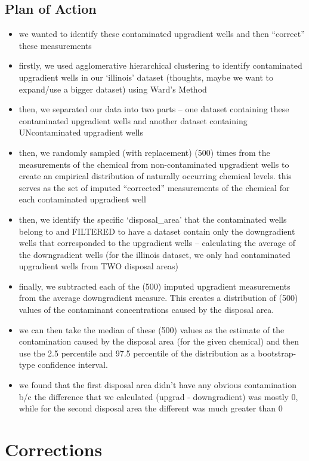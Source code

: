 \documentclass[12pt, twoside]{amherstthesis}
\begin{document}
\hypertarget{plan-of-action}{%
\section{Plan of Action}\label{plan-of-action}}
\begin{itemize}
\item
  we wanted to identify these contaminated upgradient wells and then ``correct'' these measurements
\item
  firstly, we used agglomerative hierarchical clustering to identify contaminated upgradient wells in our `illinois' dataset (thoughts, maybe we want to expand/use a bigger dataset) using Ward's Method
\item
  then, we separated our data into two parts -- one dataset containing these contaminated upgradient wells and another dataset containing UNcontaminated upgradient wells
\item
  then, we randomly sampled (with replacement) (500) times from the measurements of the chemical from non-contaminated upgradient wells to create an empirical distribution of naturally occurring chemical levels. this serves as the set of imputed ``corrected'' measurements of the chemical for each contaminated upgradient well
\item
  then, we identify the specific `disposal\_area' that the contaminated wells belong to and FILTERED to have a dataset contain only the downgradient wells that corresponded to the upgradient wells -- calculating the average of the downgradient wells (for the illinois dataset, we only had contaminated upgradient wells from TWO disposal areas)
\item
  finally, we subtracted each of the (500) imputed upgradient measurements from the average downgradient measure. This creates a distribution of (500) values of the contaminant concentrations caused by the disposal area.
\item
  we can then take the median of these (500) values as the estimate of the contamination caused by the disposal area (for the given chemical) and then use the 2.5 percentile and 97.5 percentile of the distribution as a bootstrap-type confidence interval.
\item
  we found that the first disposal area didn't have any obvious contamination b/c the difference that we calculated (upgrad - downgradient) was mostly 0, while for the second disposal area the different was much greater than 0
\end{itemize}
\hypertarget{corrections}{%
\chapter*{Corrections}\label{corrections}}
\end{document}
